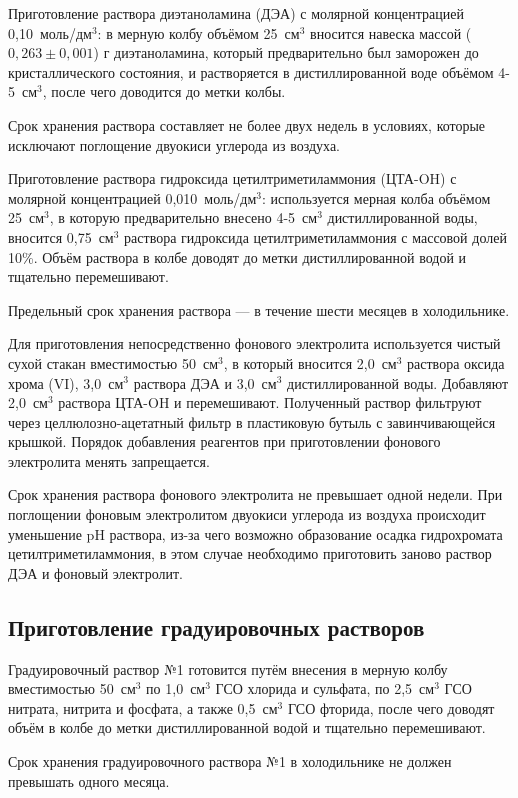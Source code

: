 Приготовление раствора диэтаноламина (ДЭА) с молярной концентрацией 0,10~моль/дм$^3$: в мерную колбу объёмом 25~см$^3$ вносится навеска массой ($0,263 \pm 0,001$) г диэтаноламина, который предварительно был заморожен до кристаллического состояния, и растворяется в дистиллированной воде объёмом 4-5~см$^3$, после чего доводится до метки колбы.

Срок хранения раствора составляет не более двух недель в условиях, которые исключают поглощение двуокиси углерода из воздуха.

Приготовление раствора гидроксида цетилтриметиламмония (ЦТА-OH) с молярной концентрацией 0,010~моль/дм$^3$: используется мерная колба объёмом 25~см$^3$, в которую предварительно внесено 4-5~см$^3$ дистиллированной воды, вносится 0,75~см$^3$ раствора гидроксида цетилтриметиламмония с массовой долей 10\%. Объём раствора в колбе доводят до метки дистиллированной водой и тщательно перемешивают.

Предельный срок хранения раствора — в течение шести месяцев в холодильнике.

Для приготовления непосредственно фонового электролита используется чистый сухой стакан вместимостью 50~см$^3$, в который вносится 2,0~см$^3$ раствора оксида хрома (VI), 3,0~см$^3$ раствора ДЭА и 3,0~см$^3$ дистиллированной воды. Добавляют 2,0~см$^3$ раствора ЦТА-OH и перемешивают. Полученный раствор фильтруют через целлюлозно-ацетатный фильтр в пластиковую бутыль с завинчивающейся крышкой. Порядок добавления реагентов при приготовлении фонового электролита менять запрещается.

Срок хранения раствора фонового электролита не превышает одной недели. При поглощении фоновым электролитом двуокиси углерода из воздуха происходит уменьшение pH раствора, из-за чего возможно образование осадка гидрохромата цетилтриметиламмония, в этом случае необходимо приготовить заново раствор ДЭА и фоновый электролит.

\subsection{Приготовление градуировочных растворов}

Градуировочный раствор №1 готовится путём внесения в мерную колбу вместимостью 50~см$^3$ по 1,0~см$^3$ ГСО хлорида и сульфата, по 2,5~см$^3$ ГСО нитрата, нитрита и фосфата, а также 0,5~см$^3$ ГСО фторида, после чего доводят объём в колбе до метки дистиллированной водой и тщательно перемешивают.

Срок хранения градуировочного раствора №1 в холодильнике не должен превышать одного месяца.

